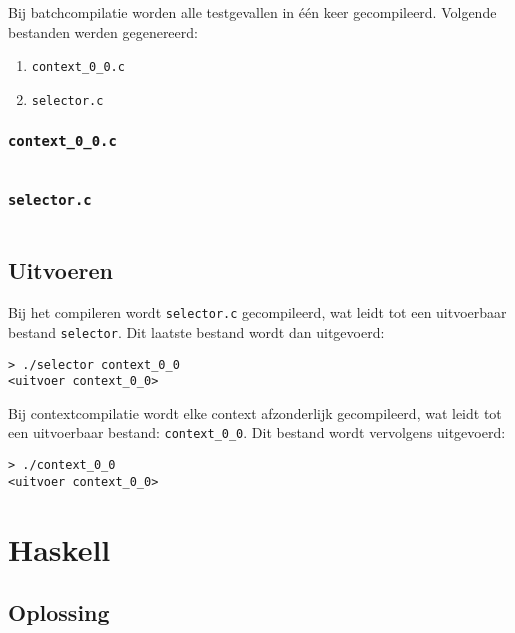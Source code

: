 Bij batchcompilatie worden alle testgevallen in één keer gecompileerd.
Volgende bestanden werden gegenereerd:

\begin{enumerate}
    \item \texttt{context\_0\_0.c}
    \item \texttt{selector.c}
\end{enumerate}

\subsubsection{\texttt{context\_0\_0.c}}

\inputminted{c}{sources/echo-function/context_0_0.c}

\subsubsection{\texttt{selector.c}}

\inputminted{c}{sources/echo-function/selector.c}

\subsection{Uitvoeren}\label{subsec:echo-function-c-uitvoeren}

Bij het compileren wordt \texttt{selector.c} gecompileerd, wat leidt tot een uitvoerbaar bestand \texttt{selector}.
Dit laatste bestand wordt dan uitgevoerd:

\begin{verbatim}
> ./selector context_0_0
<uitvoer context_0_0>
\end{verbatim}


Bij contextcompilatie wordt elke context afzonderlijk gecompileerd, wat leidt tot een uitvoerbaar bestand: \texttt{context\_0\_0}.
Dit bestand wordt vervolgens uitgevoerd:

\begin{verbatim}
> ./context_0_0
<uitvoer context_0_0>
\end{verbatim}

\section{Haskell}\label{sec:echo-function-haskell}

\subsection{Oplossing}\label{subsec:echo-function-haskell-oplossing}

